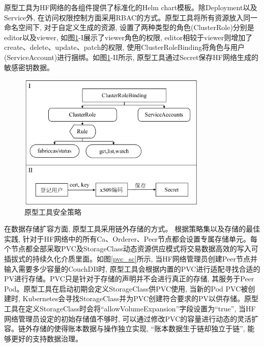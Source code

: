 原型工具为HF网络的各组件提供了标准化的Helm chart模板。除Deployment以及Service外, 在访问权限控制方面采用RBAC的方式。原型工具将所有资源放入同一命名空间下, 对于自定义生成的资源, 设置了两种类型的角色(ClusterRole)分别是editor以及viewer, 如图\ref{safety}-I展示了viewer角色的权限, editor相较于viewer则增加了create、delete、update、patch的权限, 使用ClusterRoleBinding将角色与用户(ServiceAccount)进行捆绑。如图\ref{safety}-II所示, 原型工具通过Secret保存HF网络生成的敏感密钥数据。

\begin{figure}[h] %
    \centering %
    \includegraphics[width=0.8\textwidth]{FIGs/chapter4/safety.pdf} %
    \caption{原型工具安全策略} %
    \label{safety} %
\end{figure}%

在数据存储扩容方面, 原型工具采用链外存储的方式。 根据策略集以及存储的最佳实践, 针对于HF网络中的所有Ca、Orderer、Peer节点都会设置专属存储单元。每个节点都全部采取PVC及StorageClass动态资源供应模式将交易数据高效的写入可插拔式的持续久化介质里面。如图\ref{pvc_sc}所示, 当HF网络管理员创建Peer节点并输入需要多少容量的CouchDB时, 原型工具会根据内置的PVC进行适配寻找合适的PV进行存储。PVC只是针对于存储的声明并不会进行真正的存储, 其服务于Peer Pod。原型工具在启动初期会定义StorageClass供PVC使用, 当新的Pod PVC被创建时, Kubernetes会寻找StorageClass并为PVC创建符合要求的PV以供存储。原型工具在定义StorageClass时会将“allowVolumeExpansion”字段设置为“true”, 当HF网络管理员设定的初始存储值不够时, 可以通过修改PVC的容量进行动态的灵活扩容。链外存储的使得账本数据与操作独立实现, “账本数据生于链却独立于链”, 能够更好的支持数据治理。


